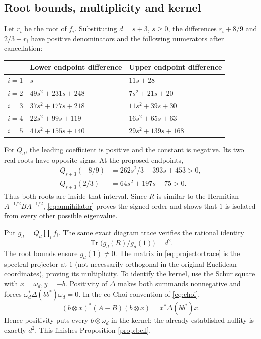 \documentclass[11pt,a4paper]{article}
\newcommand{\tr}{\operatorname{Tr}}
\begin{document}
\subsection{Root bounds, multiplicity and kernel}
Let $r_i$ be the root of $f_i$. Substituting $d=s+3$, $s\ge0$, the differences $r_i+8/9$ and $2/3-r_i$ have positive denominators and the following numerators after cancellation:
\begin{center}\small
\begin{tabular}{cll}\toprule
&Lower endpoint difference&Upper endpoint difference\\\midrule
$i=1$&$s$&$11s+28$\\
$i=2$&$49s^2+231s+248$&$7s^2+21s+20$\\
$i=3$&$37s^2+177s+218$&$11s^2+39s+30$\\
$i=4$&$22s^2+99s+119$&$16s^2+65s+63$\\
$i=5$&$41s^2+155s+140$&$29s^2+139s+168$\\\bottomrule
\end{tabular}
\end{center}
For $Q_d$, the leading coefficient is positive and the constant is negative. Its two real roots have opposite signs. At the proposed endpoints,
\begin{align*}
 Q_{s+3}(-8/9)&=262s^2/3+393s+453>0,\\
 Q_{s+3}(2/3)&=64s^2+197s+75>0.
\end{align*}
Thus both roots are inside that interval. Since $R$ is similar to the Hermitian $A^{-1/2}BA^{-1/2}$, \eqref{eq:annihilator} proves the signed order and shows that $1$ is isolated from every other possible eigenvalue.

Put $g_d=Q_d\prod_i f_i$. The same exact diagram trace verifies the rational identity
\begin{equation}\label{eq:projectortrace}
 \tr\bigl(g_d(R)/g_d(1)\bigr)=d^2.
\end{equation}
The root bounds ensure $g_d(1)\ne0$. The matrix in \eqref{eq:projectortrace} is the spectral projector at $1$ (not necessarily orthogonal in the original Euclidean coordinates), proving its multiplicity. To identify the kernel, use the Schur square with $x=\omega_d,y=-b$. Positivity of $\Delta$ makes both summands nonnegative and forces
$\omega_d^*\Delta(bb^*)\omega_d=0$. In the co-Choi convention of \eqref{eq:choi},
\[
 (b\otimes x)^*(A-B)(b\otimes x)=x^*\Delta(bb^*)x.
\]
Hence positivity puts every $b\otimes\omega_d$ in the kernel; the already established nullity is exactly $d^2$. This finishes Proposition \ref{prop:bell}.
\end{document}
